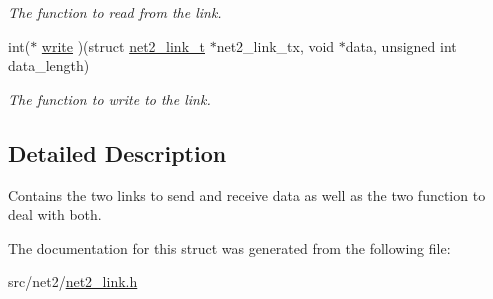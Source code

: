 \begin{DoxyCompactItemize}
\begin{DoxyCompactList}\small\item\em The function to read from the link. \end{DoxyCompactList}\item 
\hypertarget{structnet2__link__t_a20d5d49bc69b71285fc944533cde6482}{}int($\ast$ \hyperlink{structnet2__link__t_a20d5d49bc69b71285fc944533cde6482}{write} )(struct \hyperlink{structnet2__link__t}{net2\+\_\+link\+\_\+t} $\ast$net2\+\_\+link\+\_\+tx, void $\ast$data, unsigned int data\+\_\+length)\label{structnet2__link__t_a20d5d49bc69b71285fc944533cde6482}

\begin{DoxyCompactList}\small\item\em The function to write to the link. \end{DoxyCompactList}\end{DoxyCompactItemize}


\subsection{Detailed Description}
Contains the two links to send and receive data as well as the two function to deal with both. 

The documentation for this struct was generated from the following file\+:\begin{DoxyCompactItemize}
\item 
src/net2/\hyperlink{net2__link_8h}{net2\+\_\+link.\+h}\end{DoxyCompactItemize}
